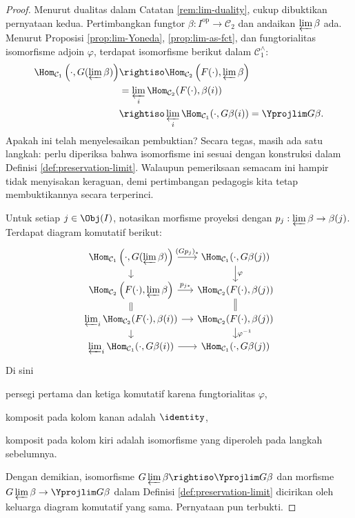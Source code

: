 \begin{proof}
	Menurut dualitas dalam Catatan \ref{rem:lim-duality}, cukup dibuktikan pernyataan kedua. Pertimbangkan fungtor $\beta: I^\text{op} \to \mathcal{C}_2$ dan andaikan $\varprojlim \beta$ ada. Menurut Proposisi \ref{prop:lim-Yoneda}, \ref{prop:lim-as-fct}, dan fungtorialitas isomorfisme adjoin $\varphi$, terdapat isomorfisme berikut dalam $\mathcal{C}_1^\wedge$:
	\begin{align*}
		\Hom_{\mathcal{C}_1} \left( \cdot, G(\varprojlim \beta) \right) & \rightiso \Hom_{\mathcal{C}_2} \left( F(\cdot), \varprojlim \beta \right) \\
		& = \varprojlim_i \Hom_{\mathcal{C}_2}(F(\cdot), \beta(i)) \\
		& \rightiso \varprojlim_i \Hom_{\mathcal{C}_1}(\cdot, G\beta(i)) = \Yprojlim G\beta.
	\end{align*}
	Apakah ini telah menyelesaikan pembuktian? Secara tegas, masih ada satu langkah: perlu diperiksa bahwa isomorfisme ini sesuai dengan konstruksi dalam Definisi \ref{def:preservation-limit}. Walaupun pemeriksaan semacam ini hampir tidak menyisakan keraguan, demi pertimbangan pedagogis kita tetap membuktikannya secara terperinci.

	Untuk setiap $j \in \Obj(I)$, notasikan morfisme proyeksi dengan $p_j: \varprojlim \beta \to \beta(j)$. Terdapat diagram komutatif berikut:
	\[\begin{tikzcd}[row sep=small, column sep=small]
		\Hom_{\mathcal{C}_1} \left( \cdot, G(\varprojlim \beta) \right) \arrow[d] \arrow[r, "(Gp_j)_*"] & \Hom_{\mathcal{C}_1}(\cdot, G\beta(j)) \arrow[d, "\varphi"] \\
		\Hom_{\mathcal{C}_2} \left( F(\cdot), \varprojlim \beta \right) \arrow[equal, d] \arrow[r, "p_{j *}"] & \Hom_{\mathcal{C}_2}(F(\cdot), \beta(j)) \arrow[equal, d] \\
		\varprojlim_i \Hom_{\mathcal{C}_2}(F(\cdot), \beta(i)) \arrow[d] \arrow[r] & \Hom_{\mathcal{C}_2}(F(\cdot), \beta(j)) \arrow[d, "\varphi^{-1}"] \\
		\varprojlim_i \Hom_{\mathcal{C}_1}(\cdot, G\beta(i)) \arrow[r] & \Hom_{\mathcal{C}_1}(\cdot, G\beta(j))
	\end{tikzcd}\]
	Di sini
	\begin{inparaenum}[(a)]
		\item persegi pertama dan ketiga komutatif karena fungtorialitas $\varphi$,
		\item komposit pada kolom kanan adalah $\identity$,
		\item komposit pada kolom kiri adalah isomorfisme yang diperoleh pada langkah sebelumnya.
	\end{inparaenum}
	Dengan demikian, isomorfisme $G\varprojlim\beta \rightiso \Yprojlim G\beta$ dan morfisme $G\varprojlim\beta \to \Yprojlim G\beta$ dalam Definisi \ref{def:preservation-limit} dicirikan oleh keluarga diagram komutatif yang sama. Pernyataan pun terbukti.
\end{proof}

